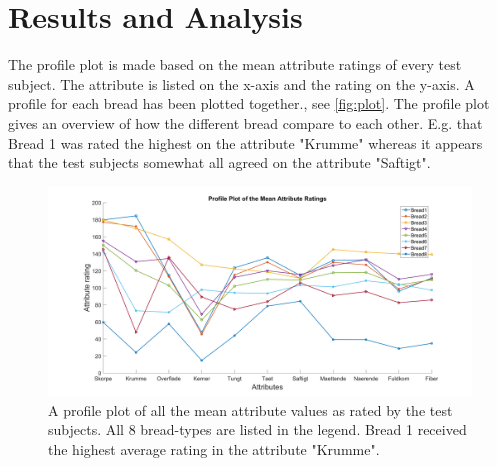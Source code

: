 \section*{Results and Analysis}
\label{Results}
%




The profile plot is made based on the mean attribute ratings of every test subject. The attribute is listed on the x-axis and the rating on the y-axis. A profile for each bread has been plotted together., see \autoref{fig:plot}. The profile plot gives an overview of how the different bread compare to each other. E.g. that Bread 1 was rated the highest on the attribute "Krumme" whereas it appears that the test subjects somewhat all agreed on the attribute "Saftigt".

\begin{figure}
\centering
\includegraphics[width=\textwidth]{Figure/profile_plot.png}
\caption{A profile plot of all the mean attribute values as rated by the test subjects. All 8 bread-types are listed in the legend. Bread 1 received the highest average rating in the attribute "Krumme".}
\label{fig:plot}
\end{figure}

\noindent


